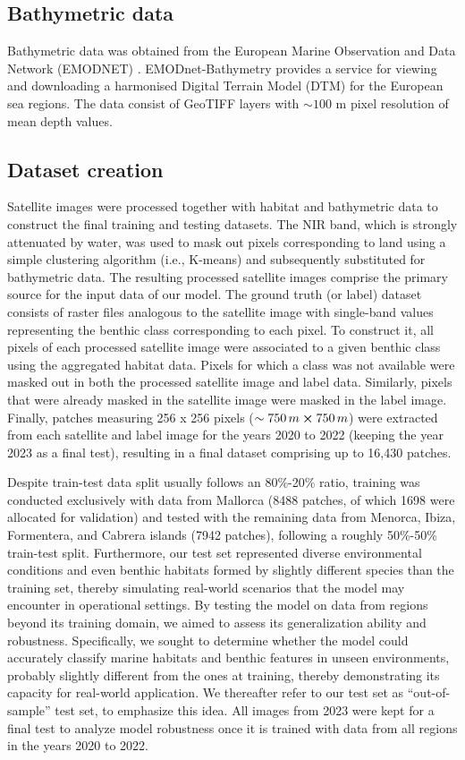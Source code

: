 \subsection{Bathymetric data}

Bathymetric data was obtained from the European Marine Observation and Data
Network (EMODNET) \cite{emodnet}. EMODnet-Bathymetry provides a service for
viewing and downloading a harmonised Digital Terrain Model (DTM) for the
European sea regions. The data consist of GeoTIFF layers with $\sim100$ m pixel
resolution of mean depth values.

\subsection{Dataset creation}

Satellite images were processed together with habitat and bathymetric data to
construct the final training and testing datasets. The NIR band, which is
strongly attenuated by water, was used to mask out pixels corresponding to land
using a simple clustering algorithm (i.e., K-means) and subsequently
substituted
for bathymetric data. The resulting processed
satellite images comprise the primary source for the input data of our model.
The ground truth (or label) dataset consists of raster files analogous to the
satellite image with single-band values representing the benthic class
corresponding to each pixel. To construct it, all pixels of each processed
satellite image were associated to a given benthic class using the aggregated
habitat data. Pixels for which a class was not available were masked out in
both the processed satellite image and label data. Similarly, pixels that were
already masked in the satellite image were masked in the label image. Finally,
patches measuring 256 x 256 pixels ($\sim 750\,m \cross 750\,m$) were extracted
from each satellite and label image for the years 2020 to 2022 (keeping the
year 2023 as a final test), resulting in a final dataset comprising up to
16,430 patches.

Despite train-test data split usually follows an 80\%-20\% ratio, training was
conducted exclusively with data from Mallorca (8488
patches, of which 1698 were allocated for validation) and tested with the
remaining data from Menorca, Ibiza, Formentera, and Cabrera islands (7942
patches), following a roughly 50\%-50\% train-test split. Furthermore, our
test set represented diverse environmental conditions and even benthic habitats
formed by slightly different species than the training set, thereby simulating
real-world scenarios that the model may encounter in operational settings. By
testing the model on data from regions beyond its training domain, we aimed to
assess its generalization ability and robustness. Specifically, we sought to
determine whether the model could accurately classify marine habitats and
benthic features in unseen environments, probably slightly different from the
ones at training, thereby demonstrating its capacity for real-world
application. We thereafter refer to our test set as ``out-of-sample'' test set,
to emphasize this idea. All images from 2023 were kept for a final test to
analyze model robustness once it is trained with data from all regions in the
years 2020 to 2022.

